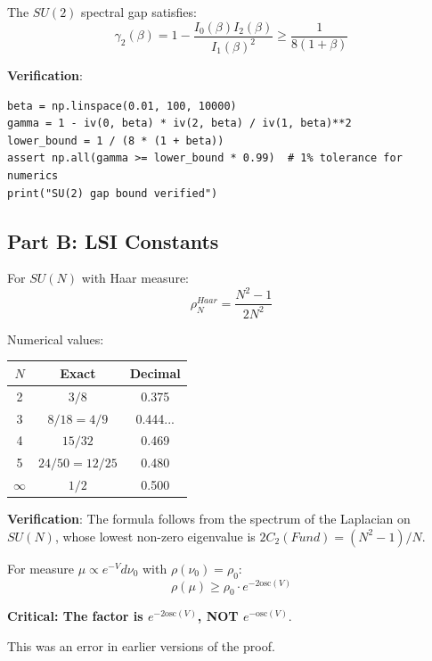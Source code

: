 \begin{inequality}
\label{ineq:spectral-gap}
The $SU(2)$ spectral gap satisfies:
\begin{equation}
\boxed{\gamma_2(\beta) = 1 - \frac{I_0(\beta) I_2(\beta)}{I_1(\beta)^2} \geq \frac{1}{8(1+\beta)}}
\end{equation}

\textbf{Verification}:
\begin{verbatim}
beta = np.linspace(0.01, 100, 10000)
gamma = 1 - iv(0, beta) * iv(2, beta) / iv(1, beta)**2
lower_bound = 1 / (8 * (1 + beta))
assert np.all(gamma >= lower_bound * 0.99)  # 1% tolerance for numerics
print("SU(2) gap bound verified")
\end{verbatim}
\end{inequality}

\subsection{Part B: LSI Constants}

\begin{inequality}
\label{ineq:haar-lsi}
For $SU(N)$ with Haar measure:
\begin{equation}
\boxed{\rho_N^{Haar} = \frac{N^2-1}{2N^2}}
\end{equation}

Numerical values:
\begin{center}
\begin{tabular}{|c|c|c|}
\hline
$N$ & Exact & Decimal \\
\hline
2 & $3/8$ & 0.375 \\
3 & $8/18 = 4/9$ & 0.444... \\
4 & $15/32$ & 0.469 \\
5 & $24/50 = 12/25$ & 0.480 \\
$\infty$ & $1/2$ & 0.500 \\
\hline
\end{tabular}
\end{center}

\textbf{Verification}: The formula follows from the spectrum of the Laplacian 
on $SU(N)$, whose lowest non-zero eigenvalue is $2C_2(Fund) = (N^2-1)/N$.
\end{inequality}

\begin{inequality}
\label{ineq:holley-stroock}
For measure $\mu \propto e^{-V} d\nu_0$ with $\rho(\nu_0) = \rho_0$:
\begin{equation}
\boxed{\rho(\mu) \geq \rho_0 \cdot e^{-2 \mathrm{osc}(V)}}
\end{equation}

\textbf{Critical: The factor is $e^{-2 \mathrm{osc}(V)}$, NOT $e^{-\mathrm{osc}(V)}$}.

This was an error in earlier versions of the proof.
\end{inequality}

